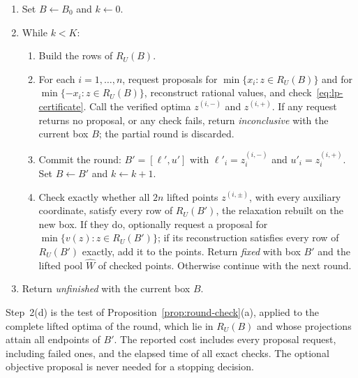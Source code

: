\begin{enumerate}
\item Set $B\leftarrow B_0$ and $k\leftarrow0$.
\item While $k<K$:
  \begin{enumerate}
  \item Build the rows of $R_U(B)$.
  \item For each $i=1,\ldots,n$, request proposals for
  $\min\{x_i:z\in R_U(B)\}$ and for $\min\{-x_i:z\in R_U(B)\}$, reconstruct
  rational values, and check~\eqref{eq:lp-certificate}. Call the verified
  optima $z^{(i,-)}$ and $z^{(i,+)}$. If any request returns no proposal, or
  any check fails, return \emph{inconclusive} with the current box $B$; the
  partial round is discarded.
  \item Commit the round: $B'=[\ell',u']$ with
  $\ell'_i=z^{(i,-)}_i$ and $u'_i=z^{(i,+)}_i$. Set $B\leftarrow B'$ and
  $k\leftarrow k+1$.
  \item Check exactly whether all $2n$ lifted points $z^{(i,\pm)}$, with every
  auxiliary coordinate, satisfy every row of $R_U(B')$, the relaxation
  rebuilt on the new box. If they do, optionally request a proposal for
  $\min\{v(z):z\in R_U(B')\}$; if its reconstruction satisfies every row of
  $R_U(B')$ exactly, add it to the points. Return \emph{fixed} with box $B'$
  and the lifted pool $\widehat W$ of checked points. Otherwise continue with
  the next round.
  \end{enumerate}
\item Return \emph{unfinished} with the current box $B$.
\end{enumerate}

Step~2(d) is the test of Proposition~\ref{prop:round-check}(a), applied to
the complete lifted optima of the round, which lie in $R_U(B)$ and whose
projections attain all endpoints of $B'$. The reported cost includes every
proposal request, including failed ones, and the elapsed time of all exact
checks. The optional objective proposal is never needed for a stopping
decision.

